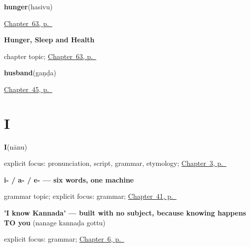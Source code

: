 \noindent\begin{minipage}[t]{\linewidth}
\raggedright
\textbf{hunger}\enspace\emph{}\enspace(hasivu)\par
\footnotesize \hyperref[ch:ka-health]{Chapter~63, p.~\pageref*{ch:ka-health}}
\end{minipage}\par\smallskip

\noindent\begin{minipage}[t]{\linewidth}
\raggedright
\textbf{Hunger, Sleep and Health}\par
\footnotesize chapter topic; \hyperref[ch:ka-health]{Chapter~63, p.~\pageref*{ch:ka-health}}
\end{minipage}\par\smallskip

\noindent\begin{minipage}[t]{\linewidth}
\raggedright
\textbf{husband}\enspace\emph{}\enspace(gaṇḍa)\par
\footnotesize \hyperref[ch:ka-older-generation]{Chapter~45, p.~\pageref*{ch:ka-older-generation}}
\end{minipage}\par\smallskip

\section*{I}

\noindent\begin{minipage}[t]{\linewidth}
\raggedright
\textbf{I}\enspace\emph{}\enspace(nānu)\par
\footnotesize explicit focus: pronunciation, script, grammar, etymology; \hyperref[ch:responding]{Chapter~3, p.~\pageref*{ch:responding}}
\end{minipage}\par\smallskip

\noindent\begin{minipage}[t]{\linewidth}
\raggedright
\textbf{i- / a- / e- — six words, one machine}\par
\footnotesize grammar topic; explicit focus: grammar; \hyperref[ch:kn-pointing-and-asking]{Chapter~41, p.~\pageref*{ch:kn-pointing-and-asking}}
\end{minipage}\par\smallskip

\noindent\begin{minipage}[t]{\linewidth}
\raggedright
\textbf{'I know Kannada' — built with no subject, because knowing happens TO you}\enspace\emph{  }\enspace(nanage kannaḍa gottu)\par
\footnotesize explicit focus: grammar; \hyperref[ch:ka-dative-case]{Chapter~6, p.~\pageref*{ch:ka-dative-case}}
\end{minipage}\par\smallskip

